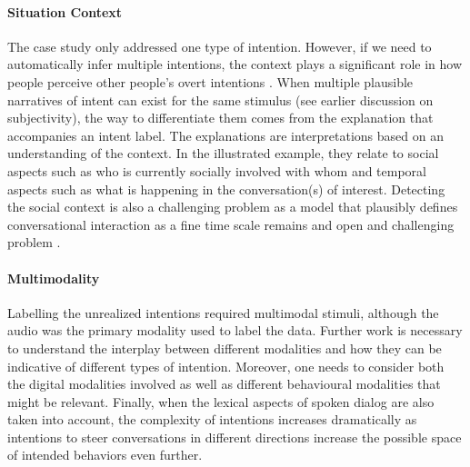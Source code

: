 \documentclass[sigconf]{acmart}
\begin{document}
\paragraph {Situation Context}
The case study only addressed one type of intention. However, if we need to automatically infer multiple intentions, the context plays a significant role in how people perceive other people's overt intentions \cite{Alhasan2023}. When multiple plausible narratives of intent can exist for the same stimulus (see earlier discussion on subjectivity), the way to differentiate them comes from the explanation that accompanies an intent label. The explanations are interpretations based on an understanding of the context. In the illustrated example, they relate to social aspects such as who is currently socially involved with whom and temporal aspects such as what is happening in the conversation(s) of interest. Detecting the social context is also a challenging problem as a model that plausibly defines conversational interaction as a fine time scale remains and open and challenging problem \cite{raman2019towards,10.1109/FG52635.2021.9667061,tan2022conversation,10.1145/3462244.3479963}.







\paragraph {Multimodality}
Labelling the unrealized intentions required multimodal stimuli, although the audio was the primary modality used to label the data. Further work is necessary to understand the interplay between different modalities and how they can be indicative of different types of intention. Moreover, one needs to consider both the digital modalities involved as well as different behavioural modalities that might be relevant. Finally, when the lexical aspects of spoken dialog are also taken into account, the complexity of intentions increases dramatically as intentions to steer conversations in different directions increase the possible space of intended behaviors even further.
\end{document}
